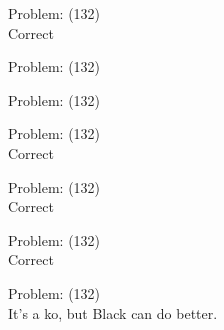 \documentclass[11pt]{article}
\begin{document}
\begin{minipage}[t]{0.5\textwidth}
  {\centering
  
  Problem: (132)\\
  Correct\\
  }
\end{minipage}
\begin{minipage}[t]{0.5\textwidth}
  {\centering
  
  Problem: (132)\\
  
  }
\end{minipage}
\begin{minipage}[t]{0.5\textwidth}
  {\centering
  
  Problem: (132)\\
  
  }
\end{minipage}
\begin{minipage}[t]{0.5\textwidth}
  {\centering
  
  Problem: (132)\\
  Correct\\
  }
\end{minipage}
\begin{minipage}[t]{0.5\textwidth}
  {\centering
  
  Problem: (132)\\
  Correct\\
  }
\end{minipage}
\begin{minipage}[t]{0.5\textwidth}
  {\centering
  
  Problem: (132)\\
  Correct\\
  }
\end{minipage}
\begin{minipage}[t]{0.5\textwidth}
  {\centering
  
  Problem: (132)\\
  It's a ko, but Black can do better.\\
  }
\end{minipage}
\end{document}
